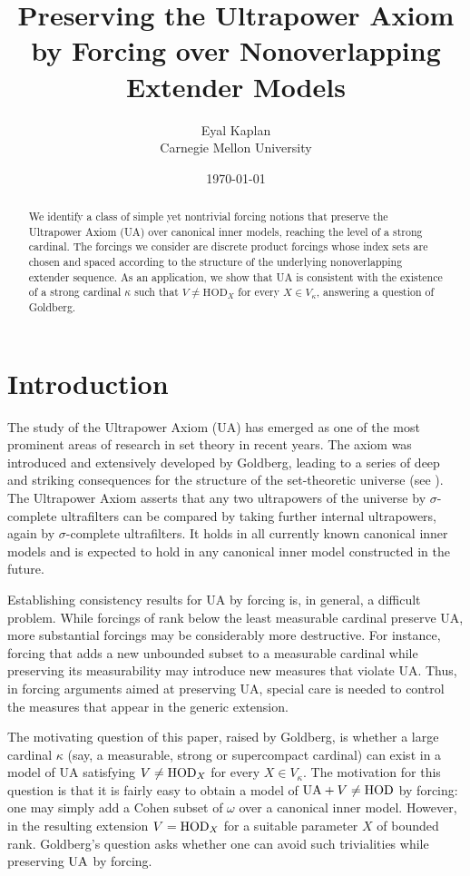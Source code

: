 \documentclass{article}
\title{Preserving the Ultrapower Axiom by Forcing over Nonoverlapping Extender Models}
\author{Eyal Kaplan\\
Carnegie Mellon University}
\date{\today}
\theoremstyle{definition}
\theoremstyle{plain}
\begin{document}
\maketitle


\begin{abstract}
    We identify a class of simple yet nontrivial forcing notions that preserve the Ultrapower Axiom (UA) over canonical inner models, reaching the level of a strong cardinal. The forcings we consider are discrete product forcings whose index sets are chosen and spaced according to the structure of the underlying nonoverlapping extender sequence.  As an application, we show that UA is consistent with the existence of a strong cardinal $\kappa$ such that $V\neq \text{HOD}_X$ for every $X\in V_\kappa$, answering a question of Goldberg.
    \end{abstract}

\section{Introduction}

The study of the Ultrapower Axiom ({\rm UA}) has emerged as one of the most prominent areas of research in set theory in recent years. The axiom was introduced and extensively developed by Goldberg, leading to a series of deep and striking consequences for the structure of the set-theoretic universe (see \cite{goldbergtheultrapoweraxiom}). The Ultrapower Axiom asserts that any two ultrapowers of the universe by $\sigma$-complete ultrafilters can be compared by taking further internal ultrapowers, again by $\sigma$-complete ultrafilters. It holds in all currently known canonical inner models and is expected to hold in any canonical inner model constructed in the future.


Establishing consistency results for {\rm UA} by forcing is, in general, a difficult problem. While forcings of rank below the least measurable cardinal preserve {\rm UA}, more substantial forcings may be considerably more destructive. For instance, forcing that adds a new unbounded subset to a measurable cardinal while preserving its measurability may introduce new measures that violate {\rm UA}. Thus, in forcing arguments aimed at preserving {\rm UA}, special care is needed to control the measures that appear in the generic extension.


The motivating question of this paper, raised by Goldberg, is whether a large cardinal $\kappa$ (say, a measurable, strong or  supercompact cardinal) can exist in a model of {\rm UA} satisfying
$V\neq {\rm HOD}_X$
for every $X\in V_\kappa$. The motivation for this question is that it is fairly easy to obtain a model of ${\rm UA}+V\neq{\rm HOD}$ by forcing: one may simply add a Cohen subset of $\omega$ over a canonical inner model. However, in the resulting extension $V={\rm HOD}_X$ for a suitable parameter $X$ of bounded rank. Goldberg's question asks whether one can avoid such trivialities while preserving \({\rm UA}\) by forcing. 
\end{document}
